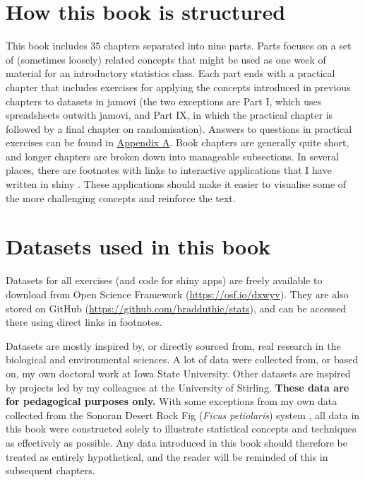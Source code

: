 \documentclass[
  openany]{scrbook}
\begin{document}
\hypertarget{structure}{%
\section*{How this book is structured}\label{structure}}

This book includes 35 chapters separated into nine parts.
Parts focuses on a set of (sometimes loosely) related concepts that might be used as one week of material for an introductory statistics class.
Each part ends with a practical chapter that includes exercises for applying the concepts introduced in previous chapters to datasets in jamovi (the two exceptions are Part I, which uses spreadsheets outwith jamovi, and Part IX, in which the practical chapter is followed by a final chapter on randomisation).
Answers to questions in practical exercises can be found in \protect\hyperlink{appendexA}{Appendix A}.
Book chapters are generally quite short, and longer chapters are broken down into manageable subsections.
In several places, there are footnotes with links to interactive applications that I have written in shiny \citep{Rshiny, Wickham2021}.
These applications should make it easier to visualise some of the more challenging concepts and reinforce the text.

\hypertarget{datasets}{%
\section*{Datasets used in this book}\label{datasets}}

Datasets for all exercises (and code for shiny apps) are freely available to download from Open Science Framework (\url{https://osf.io/dxwyv}).
They are also stored on GitHub (\url{https://github.com/bradduthie/stats}), and can be accessed there using direct links in footnotes.

Datasets are mostly inspired by, or directly sourced from, real research in the biological and environmental sciences.
A lot of data were collected from, or based on, my own doctoral work at Iowa State University.
Other datasets are inspired by projects led by my colleagues at the University of Stirling.
\textbf{These data are for pedagogical purposes only.}
With some exceptions from my own data collected from the Sonoran Desert Rock Fig (\emph{Ficus petiolaris}) system \citep[see][]{Duthie2015b, Duthie2016}, all data in this book were constructed solely to illustrate statistical concepts and techniques as effectively as possible.
Any data introduced in this book should therefore be treated as entirely hypothetical, and the reader will be reminded of this in subsequent chapters.
\end{document}
